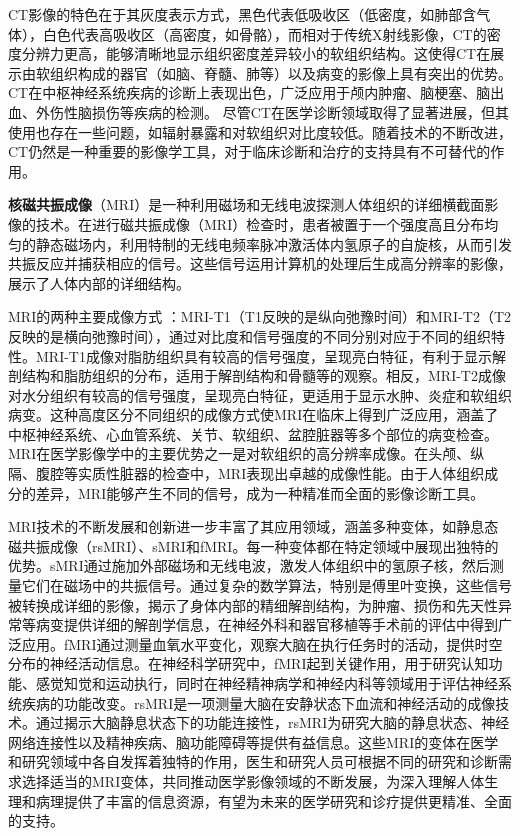 CT影像的特色在于其灰度表示方式，黑色代表低吸收区（低密度，如肺部含气体），白色代表高吸收区（高密度，如骨骼），而相对于传统X射线影像，CT的密度分辨力更高，能够清晰地显示组织密度差异较小的软组织结构。这使得CT在展示由软组织构成的器官（如脑、脊髓、肺等）以及病变的影像上具有突出的优势。
CT在中枢神经系统疾病的诊断上表现出色，广泛应用于颅内肿瘤、脑梗塞、脑出血、外伤性脑损伤等疾病的检测。
尽管CT在医学诊断领域取得了显著进展，但其使用也存在一些问题，如辐射暴露和对软组织对比度较低。随着技术的不断改进，CT仍然是一种重要的影像学工具，对于临床诊断和治疗的支持具有不可替代的作用。

\textbf{核磁共振成像}（MRI）\cite{young1984nuclear}是一种利用磁场和无线电波探测人体组织的详细横截面影像的技术。在进行磁共振成像（MRI）检查时，患者被置于一个强度高且分布均匀的静态磁场内，利用特制的无线电频率脉冲激活体内氢原子的自旋核，从而引发共振反应并捕获相应的信号。这些信号运用计算机的处理后生成高分辨率的影像，展示了人体内部的详细结构。

MRI的两种主要成像方式
：MRI-T1（T1反映的是纵向弛豫时间）和MRI-T2（T2反映的是横向弛豫时间），通过对比度和信号强度的不同分别对应于不同的组织特性。MRI-T1成像对脂肪组织具有较高的信号强度，呈现亮白特征，有利于显示解剖结构和脂肪组织的分布，适用于解剖结构和骨髓等的观察。相反，MRI-T2成像对水分组织有较高的信号强度，呈现亮白特征，更适用于显示水肿、炎症和软组织病变。这种高度区分不同组织的成像方式使MRI在临床上得到广泛应用，涵盖了中枢神经系统、心血管系统、关节、软组织、盆腔脏器等多个部位的病变检查。
MRI在医学影像学中的主要优势之一是对软组织的高分辨率成像。在头颅、纵隔、腹腔等实质性脏器的检查中，MRI表现出卓越的成像性能。由于人体组织成分的差异，MRI能够产生不同的信号，成为一种精准而全面的影像诊断工具。

MRI技术的不断发展和创新进一步丰富了其应用领域，涵盖多种变体，如静息态磁共振成像（rsMRI）、sMRI和fMRI。每一种变体都在特定领域中展现出独特的优势。sMRI通过施加外部磁场和无线电波，激发人体组织中的氢原子核，然后测量它们在磁场中的共振信号。通过复杂的数学算法，特别是傅里叶变换，这些信号被转换成详细的影像，揭示了身体内部的精细解剖结构，为肿瘤、损伤和先天性异常等病变提供详细的解剖学信息，在神经外科和器官移植等手术前的评估中得到广泛应用。fMRI通过测量血氧水平变化，观察大脑在执行任务时的活动，提供时空分布的神经活动信息。在神经科学研究中，fMRI起到关键作用，用于研究认知功能、感觉知觉和运动执行，同时在神经精神病学和神经内科等领域用于评估神经系统疾病的功能改变。rsMRI是一项测量大脑在安静状态下血流和神经活动的成像技术。通过揭示大脑静息状态下的功能连接性，rsMRI为研究大脑的静息状态、神经网络连接性以及精神疾病、脑功能障碍等提供有益信息。这些MRI的变体在医学和研究领域中各自发挥着独特的作用，医生和研究人员可根据不同的研究和诊断需求选择适当的MRI变体，共同推动医学影像领域的不断发展，为深入理解人体生理和病理提供了丰富的信息资源，有望为未来的医学研究和诊疗提供更精准、全面的支持。

